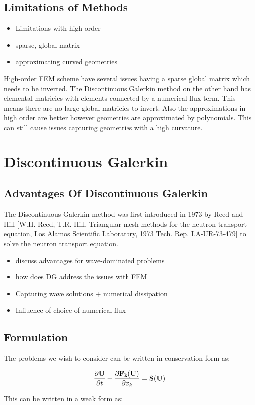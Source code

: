 \subsection{Limitations of Methods}
\begin{itemize}
	\item Limitations with high order
	\item sparse, global matrix
	\item approximating curved geometries
\end{itemize}
High-order FEM scheme have several issues having a sparse global matrix which needs to be inverted. The Discontinuous Galerkin method on the other hand has elemental matricies with elements connected by a numerical flux term. This means there are no large global matricies to invert. Also the approximations in high order are better however geometries are approximated by polynomials. This can still cause issues capturing geometries with a high curvature.

\section{Discontinuous Galerkin}
\subsection{Advantages Of Discontinuous Galerkin}
The Discontinuous Galerkin method was first introduced in 1973 by Reed and Hill [W.H. Reed, T.R. Hill, Triangular mesh methods for the neutron transport equation, Los Alamos Scientific Laboratory, 1973 Tech. Rep. LA-UR-73-479] to solve the neutron transport equation.
\begin{itemize}
	\item discuss advantages for wave-dominated problems
	\item how does DG address the issues with FEM
	\item Capturing wave solutions + numerical dissipation
	\item Influence of choice of numerical flux
\end{itemize}
\subsection{Formulation}
The problems we wish to consider can be written in conservation form as:

$$
\frac{\partial \mathbf{U}}{\partial t} + \frac{\partial \mathbf{F_k (\mathbf{U})} }{\partial x_k}  = \mathbf{S(U)}
$$

This can be written in a weak form as:

